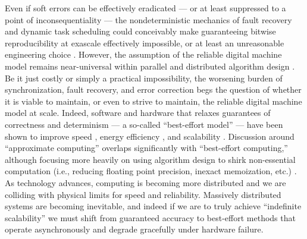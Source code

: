 Even if soft errors can be effectively eradicated --- or at least suppressed to a point of inconsequentiality --- the nondeterministic mechanics of fault recovery and dynamic task scheduling could conceivably make guaranteeing bitwise reproducibility at exascale effectively impossible, or at least an unreasonable engineering choice \citep{dongarra2014applied}.
However, the assumption of the reliable digital machine model remains near-universal within parallel and distributed algorithm design \citep{chakradhar2010best}.
Be it just costly or simply a practical impossibility, the worsening burden of synchronization, fault recovery, and error correction begs the question of whether it is viable to maintain, or even to strive to maintain, the reliable digital machine model at scale.
Indeed, software and hardware that relaxes guarantees of correctness and determinism --- a so-called ``best-effort model'' --- have been shown to improve speed \citep{chakrapani2008probabilistic}, energy efficiency \citep{chakrapani2008probabilistic,bocquet2018memory}, and scalability \citep{meng2009best}.
Discussion around ``approximate computing'' overlaps significantly with ``best-effort computing,'' although focusing more heavily on using algorithm design to shirk non-essential computation (i.e., reducing floating point precision, inexact memoization, etc.) \citep{mittal2016survey}.
As technology advances, computing is becoming more distributed and we are colliding with physical limits for speed and reliability.
Massively distributed systems are becoming inevitable, and indeed if we are to truly achieve ``indefinite scalability'' \citep{ackley2011pursue} we must shift from guaranteed accuracy to best-effort methods that operate asynchronously and degrade gracefully under hardware failure.

